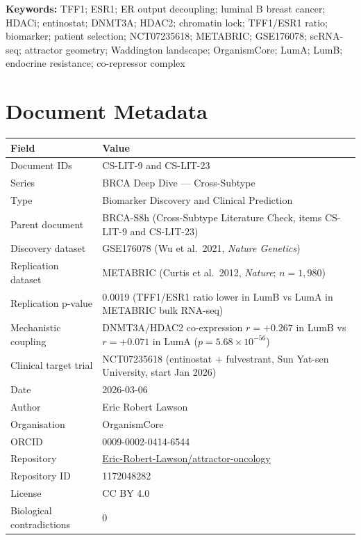 \documentclass[12pt, a4paper]{article}
\begin{document}
\vspace{0.5em}
\noindent\textbf{Keywords:}
TFF1; ESR1; ER output decoupling; luminal B breast
cancer; HDACi; entinostat; DNMT3A; HDAC2; chromatin
lock; TFF1/ESR1 ratio; biomarker; patient selection;
NCT07235618; METABRIC; GSE176078; scRNA-seq; attractor
geometry; Waddington landscape; OrganismCore; LumA;
LumB; endocrine resistance; co-repressor complex

\newpage
\tableofcontents
\newpage

\section{Document Metadata}

\begin{center}
\begin{tabular}{ll}
\toprule
\textbf{Field} & \textbf{Value} \\
\midrule
Document IDs
& CS-LIT-9 and CS-LIT-23 \\
Series
& BRCA Deep Dive --- Cross-Subtype \\
Type
& Biomarker Discovery and Clinical Prediction \\
Parent document
& BRCA-S8h (Cross-Subtype Literature Check,
  items CS-LIT-9 and CS-LIT-23) \\
Discovery dataset
& GSE176078 (Wu et al.\ 2021,
  \textit{Nature Genetics}) \\
Replication dataset
& METABRIC (Curtis et al.\ 2012,
  \textit{Nature}; $n=1{,}980$) \\
Replication p-value
& 0.0019 (TFF1/ESR1 ratio lower in LumB
  vs LumA in METABRIC bulk RNA-seq) \\
Mechanistic coupling
& DNMT3A/HDAC2 co-expression $r=+0.267$
  in LumB vs $r=+0.071$ in LumA
  ($p=5.68\times10^{-56}$) \\
Clinical target trial
& NCT07235618 (entinostat $+$ fulvestrant,
  Sun Yat-sen University, start Jan 2026) \\
Date
& 2026-03-06 \\
Author
& Eric Robert Lawson \\
Organisation
& OrganismCore \\
ORCID
& 0009-0002-0414-6544 \\
Repository
& \href{https://github.com/Eric-Robert-Lawson/attractor-oncology}
       {Eric-Robert-Lawson/attractor-oncology} \\
Repository ID
& 1172048282 \\
License
& CC BY 4.0 \\
Biological contradictions
& 0 \\
\bottomrule
\end{tabular}
\end{center}
\end{document}
